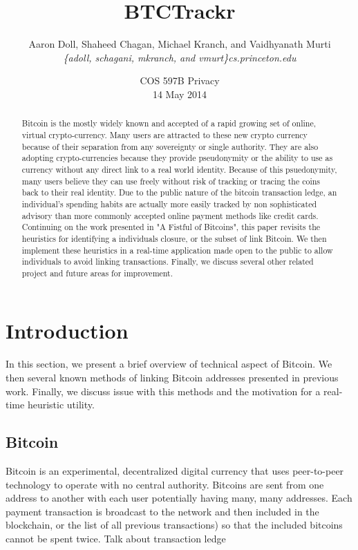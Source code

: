 \documentclass[10pt, letterpaper, twocolumn, twoside]{article}
\title{\bf BTCTrackr}
\author{Aaron Doll, Shaheed Chagan, Michael Kranch, and Vaidhyanath Murti\\
\textit{\{adoll, schagani, mkranch, and vmurt\}cs.princeton.edu}}
\date{COS 597B Privacy \\ 14 May 2014}
\begin{document}
\maketitle

\thispagestyle{empty}

\begin{abstract}
Bitcoin is the mostly widely known and accepted of a rapid growing set of online, virtual crypto-currency. Many users are attracted to these new crypto currency because of their separation from any sovereignty or single authority. They are also adopting crypto-currencies because they provide pseudonymity or the ability to use as currency without any direct link to a real world identity. Because of this psuedonymity, many users believe they can use freely without risk of tracking or tracing the coins back to their real identity. Due to the public nature of the bitcoin transaction ledge, an individual's spending habits are actually more easily tracked by non sophisticated advisory than more commonly accepted online payment methods like credit cards. Continuing on the work presented in "A Fistful of Bitcoins", this paper revisits the heuristics for identifying a individuals closure, or the subset of link Bitcoin. We then implement these heuristics in a real-time application made open to the public to allow individuals to avoid linking transactions. Finally, we discuss several other related project and future areas for improvement.

\end{abstract}

\section{Introduction}
\label{intro}
In this section, we present a brief overview of technical aspect of Bitcoin. We then several known methods of linking Bitcoin addresses presented in previous work. Finally, we discuss issue with this methods and the motivation for a real-time heuristic utility. 

\subsection{Bitcoin}
Bitcoin is an experimental, decentralized digital currency that uses peer-to-peer technology to operate with no central authority. Bitcoins are sent from one address to another with each user potentially having many, many addresses. Each payment transaction is broadcast to the network and then included in the blockchain, or the list of all previous transactions) so that the included bitcoins cannot be spent twice. 
Talk about transaction ledge
\end{document}
